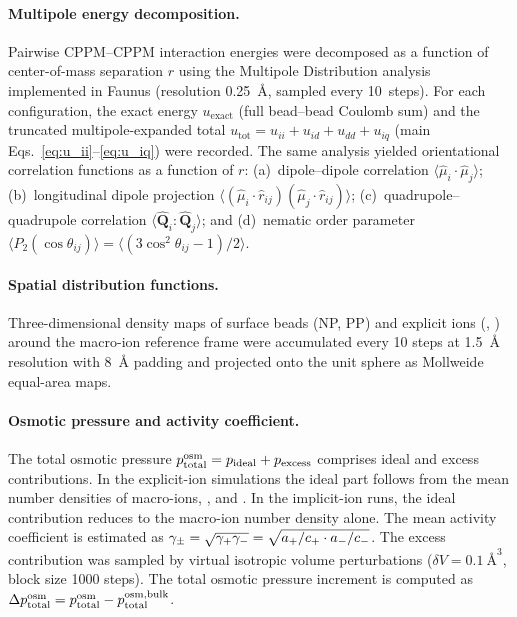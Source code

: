 \documentclass{article}
\begin{document}
\paragraph{Multipole energy decomposition.}

Pairwise CPPM--CPPM interaction energies were decomposed as a function of center-of-mass separation $r$ using the Multipole Distribution analysis implemented in Faunus (resolution \qty{0.25}{\angstrom}, sampled every 10~steps).
For each configuration, the exact energy $u_\text{exact}$ (full bead--bead Coulomb sum) and the truncated multipole-expanded total $u_\text{tot} = u_{ii} + u_{id} + u_{dd} + u_{iq}$ (main Eqs.~\ref{eq:u_ii}--\ref{eq:u_iq}) were recorded.
The same analysis yielded orientational correlation functions as a function of $r$:
(a)~dipole--dipole correlation $\langle\hat{\mu}_i\cdot\hat{\mu}_j\rangle$;
(b)~longitudinal dipole projection $\langle(\hat{\mu}_i\cdot\hat{r}_{ij})(\hat{\mu}_j\cdot\hat{r}_{ij})\rangle$;
(c)~quadrupole--quadrupole correlation $\langle\hat{\mathbf{Q}}_i{:}\hat{\mathbf{Q}}_j\rangle$; and
(d)~nematic order parameter $\langle P_2(\cos\theta_{ij})\rangle = \langle(3\cos^2\theta_{ij}-1)/2\rangle$.

\paragraph{Spatial distribution functions.}

Three-dimensional density maps of surface beads (NP, PP) and explicit ions (, ) around the macro-ion reference frame were accumulated every 10 steps at \qty{1.5}{\angstrom} resolution with \qty{8}{\angstrom} padding and projected onto the unit sphere as Mollweide equal-area maps.

\paragraph{Osmotic pressure and activity coefficient.}

The total osmotic pressure $p^\mathrm{osm}_\mathrm{total} = p_\mathrm{ideal} + p_\mathrm{excess}$ comprises ideal and excess contributions.
In the explicit-ion simulations the ideal part follows from the mean number densities of macro-ions, , and .
In the implicit-ion runs, the ideal contribution reduces to the macro-ion number density alone.
The mean activity coefficient is estimated as $\gamma_{\pm} = \sqrt{\gamma_+\gamma_-} = \sqrt{a_+/c_+\cdot a_-/c_-}$.
The excess contribution was sampled by virtual isotropic volume perturbations ($\delta V = \qty{0.1}{\cubic\angstrom}$, block size 1000 steps).
The total osmotic pressure increment is computed as $\Delta p^\mathrm{osm}_\mathrm{total} = p^\mathrm{osm}_\mathrm{total} - p^{\mathrm{osm},\text{bulk}}_\mathrm{total}$.
\end{document}
